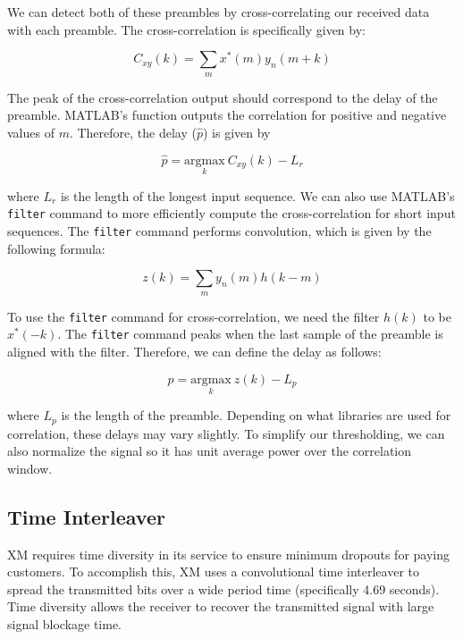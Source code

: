\documentclass[conference,onecolumn]{IEEEtran}
\begin{document}
\noindent We can detect both of these preambles by cross-correlating our received data with each preamble. The cross-correlation is specifically given by:

\begin{equation}
	C_{xy}(k) = \sum_m{x^*(m)y_n(m+k)}
\end{equation}

\noindent The peak of the cross-correlation output should correspond to the delay of the preamble. MATLAB's  function outputs the correlation for positive and negative values of $m$. Therefore, the delay ($\hat{p}$) is given by

\begin{equation}
	\hat{p} =  \underset{k}{\text{argmax}}\ C_{xy}(k) - L_r
\end{equation}

\noindent where $L_r$ is the length of the longest input sequence. We can also use MATLAB's \texttt{filter} command to more efficiently compute the cross-correlation for short input sequences. The \texttt{filter} command performs convolution, which is given by the following formula:

\begin{equation}
	z(k) = \sum_{m}{y_n(m)h(k - m)}
\end{equation}

\noindent To use the \texttt{filter} command for cross-correlation, we need the filter $h(k)$ to be $x^*(-k)$. The \texttt{filter} command peaks when the last sample of the preamble is aligned with the filter. Therefore, we can define the delay as follows:

\begin{equation}
	\hat{p} = \underset{k}{\text{argmax}}\ z(k) - L_p
\end{equation}

\noindent where $L_p$ is the length of the preamble. Depending on what libraries are used for correlation, these delays may vary slightly. To simplify our thresholding, we can also normalize the signal so it has unit average power over the correlation window.

\subsection{Time Interleaver}

XM requires time diversity in its service to ensure minimum dropouts for paying customers.  To accomplish this, XM uses a convolutional time interleaver to spread the transmitted bits over a wide period time (specifically 4.69 seconds).  Time diversity allows the receiver to recover the transmitted signal with large signal blockage time. 
\end{document}
